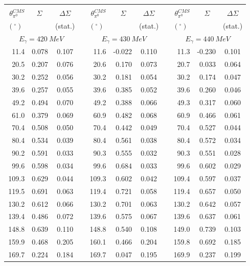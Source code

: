\begin{table}[htbp] 
\begin{center} 
\begin{tabular}{|r|r|c|l|r|r|c|l|r|r|c|} 

\cline{1-3} 
\cline{5-7} 
\cline{9-11} 
& & & & & & & & & &\\ 
$\theta_{\pi^0}^{CMS}$ & 
$\Sigma\;\;\;$ & 
${\Delta}\Sigma$ & & 
$\theta_{\pi^0}^{CMS}$ & 
$\Sigma\;\;\;$ & 
${\Delta}\Sigma$ & & 
$\theta_{\pi^0}^{CMS}$ & 
$\Sigma\;\;\;$ & 
${\Delta}\Sigma$ \\ 
 $(^{\circ})\;$ & &(stat.) & & $(^{\circ})\;$ & &(stat.) & & $(^{\circ})\;$ & &(stat.) \\ 
\cline{1-3} 
\cline{5-7} 
\cline{9-11} 
\multicolumn{3}{|c|}{ $E_{\gamma}=420~MeV$} & & 
\multicolumn{3}{c|}{ $E_{\gamma}=430~MeV$} & & 
\multicolumn{3}{c|}{ $E_{\gamma}=440~MeV$} \\ 
\cline{1-3} 
\cline{5-7} 
\cline{9-11} 
 11.4 & 0.078 & 0.107 & &  11.6 & -0.022 & 0.110 & &  11.3 & -0.230 & 0.101 \\ 
 20.5 & 0.207 & 0.076 & &  20.6 & 0.170 & 0.073 & &  20.7 & 0.033 & 0.064 \\ 
 30.2 & 0.252 & 0.056 & &  30.2 & 0.181 & 0.054 & &  30.2 & 0.174 & 0.047 \\ 
 39.6 & 0.257 & 0.055 & &  39.6 & 0.385 & 0.052 & &  39.6 & 0.260 & 0.046 \\ 
 49.2 & 0.494 & 0.070 & &  49.2 & 0.388 & 0.066 & &  49.3 & 0.317 & 0.060 \\ 
 61.0 & 0.379 & 0.069 & &  60.9 & 0.482 & 0.068 & &  60.9 & 0.466 & 0.061 \\ 
 70.4 & 0.508 & 0.050 & &  70.4 & 0.442 & 0.049 & &  70.4 & 0.527 & 0.044 \\ 
 80.4 & 0.534 & 0.039 & &  80.4 & 0.561 & 0.038 & &  80.4 & 0.572 & 0.034 \\ 
 90.2 & 0.591 & 0.033 & &  90.3 & 0.555 & 0.032 & &  90.3 & 0.551 & 0.028 \\ 
 99.6 & 0.598 & 0.034 & &  99.6 & 0.684 & 0.033 & &  99.6 & 0.602 & 0.029 \\ 
109.3 & 0.629 & 0.044 & & 109.3 & 0.602 & 0.042 & & 109.4 & 0.597 & 0.037 \\ 
119.5 & 0.691 & 0.063 & & 119.4 & 0.721 & 0.058 & & 119.4 & 0.657 & 0.050 \\ 
130.2 & 0.612 & 0.066 & & 130.2 & 0.701 & 0.063 & & 130.2 & 0.642 & 0.057 \\ 
139.4 & 0.486 & 0.072 & & 139.6 & 0.575 & 0.067 & & 139.6 & 0.637 & 0.061 \\ 
148.8 & 0.639 & 0.110 & & 148.8 & 0.540 & 0.108 & & 149.0 & 0.739 & 0.103 \\ 
159.9 & 0.468 & 0.205 & & 160.1 & 0.466 & 0.204 & & 159.8 & 0.692 & 0.185 \\ 
169.7 & 0.224 & 0.184 & & 169.7 & 0.047 & 0.195 & & 169.9 & 0.237 & 0.199 \\ 
\cline{1-3} 
\cline{5-7} 
\cline{9-11} 
\end{tabular} 

\end{center} 
\end{table} 

